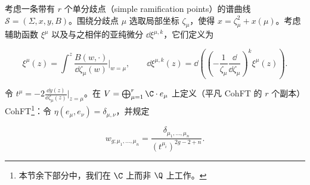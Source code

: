 

考虑一条带有 $r$ 个单分歧点（simple ramification points）的谱曲线 $\mathcal S=(\Sigma,x,y,B)$。围绕分歧点 $\mu$ 选取局部坐标 $\zeta_\mu$，使得 $x=\zeta_\mu^2+x(\mu)$。考虑辅助函数 $\xi^\mu$ 以及与之相伴的亚纯微分 $\dd\xi^{\mu,k}$，它们定义为

\begin{equation}
  \xi^\mu(z)=\int^{z}\frac{B(w,\cdot)}{\dd\zeta_\mu(w)}\Big|_{w=\mu},
  \qquad
  \dd\xi^{\mu,k}(z)=\dd\left(\left(-\frac{1}{\zeta_\mu}\frac{\dd}{\dd\zeta_\mu}\right)^{k}\xi^\mu(z)\right).
  \tag{3.51}
\end{equation}



令 $t^\mu=-2\frac{\dd y(z)}{\dd\zeta_\mu(z)}\Big|_{z=\mu}$。在 $V=\bigoplus_{\mu=1}^{r}\C\cdot e_\mu$ 上定义（平凡 CohFT 的 $r$ 个副本）CohFT\footnote{本节余下部分中，我们在 $\C$ 上而非 $\Q$ 上工作。}：令 $\eta(e_\mu,e_\nu)=\delta_{\mu,\nu}$，并规定

\begin{equation}
  w_{g;\mu_1,\dots,\mu_n}=\frac{\delta_{\mu_1,\dots,\mu_n}}{(t^{\mu_i})^{2g-2+n}}.
  \tag{3.52}
\end{equation}



